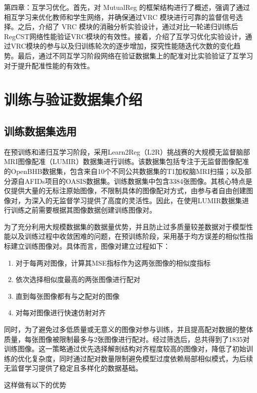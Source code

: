 第四章：互学习优化。首先，对 MutualReg 的框架结构进行了概述，强调了通过相互学习来优化教师和学生网络，并确保通过VRC 模块进行可靠的监督信号选择。之后，介绍了 VRC 模块的消融分析实验设计，通过对比一轮递归训练后RegCST网络性能验证VRC模块的有效性。接着，介绍了互学习优化实验设计，通过VRC模块的参与以及归训练轮次的逐步增加，探究性能随迭代次数的变化趋势。最后，通过不同互学习阶段网络在验证数据集上的配准对比实验验证了互学习对于提升配准性能的有效性。

\chapter{训练与验证数据集介绍}

\section{训练数据集选用}

在预训练和递归互学习阶段，采用Learn2Reg（L2R）挑战赛的大规模无监督脑部MRI图像配准（LUMIR）数据集进行训练。该数据集包括专注于无监督图像配准的OpenBHB\cite{dufumier2022openbhb}数据集，包含来自10个不同公共数据集的T1加权脑MRI扫描；以及部分源自AFIDs项目的OASIS\cite{marcus2007open}数据集。训练数据集中包含3384张图像。其核心特点是仅提供大量的无标注原始图像，不限制具体的图像配对方式，由参与者自由创建图像对，为深入的无监督学习提供了高度的灵活性。因此，在使用LUMIR数据集进行训练之前需要根据其图像数据创建训练图像对。

为了充分利用大规模数据集的数据量优势，并且防止过多质量较差数据对于模型性能以及训练过程中收敛困难的问题，在预训练阶段，采用基于均方误差的相似性指标建立训练图像对。具体而言，图像对建立过程如下：

\begin{enumerate}
    \item 对于每两对图像，计算其MSE指标作为这两张图像的相似度指标
    \item 依次选择相似度最高的两张图像进行配对
    \item 直到每张图像都有与之配对的图像
    \item 对每对图像进行快速仿射对齐
\end{enumerate}

同时，为了避免过多低质量或无意义的图像对参与训练，并且提高配对数据的整体质量，每张图像被限制最多与2张图像进行配对。经过筛选后，总共得到了1835对训练图像。这一策略通过优先选择解剖结构对齐程度较高的图像对，降低了初始训练的优化复杂度，同时通过配对数量限制避免模型过度依赖局部相似模式，为后续无监督学习提供了稳定且多样化的数据基础。

这样做有以下的优势

